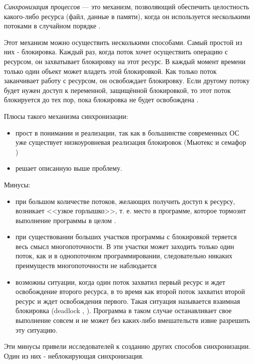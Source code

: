 \documentclass[12pt]{article}
\begin{document}
{			\par \textit{Синхронизация процессов} — это механизм, позволяющий обеспечить целостность какого-либо ресурса (файл, данные в памяти), когда он используется несколькими потоками в случайном порядке \cite{Sync}.
			\par Этот механизм можно осуществить несколькими способами. Самый простой из них - блокировка. Каждый раз, когда поток хочет осуществить операцию с ресурсом, он захватывает блокировку на этот ресурс. В каждый момент времени только один объект может владеть этой блокировкой. Как только поток заканчивает работу с ресурсом, он освобождает блокировку. Если другому потоку будет нужен доступ к переменной, защищённой блокировкой, то этот поток блокируется до тех пор, пока блокировка не будет освобождена \cite{lockmsdn}.
			\par Плюсы такого механизма синхронизации: 
			\begin{itemize}
				\item прост в понимании и реализации, так как в большинстве современных ОС уже существует низкоуровневая реализация блокировок (Мьютекс и семафор \cite{Tanenb})
				\item решает описанную выше проблему.
			\end{itemize}
				\vspace{1cm}
				\par Минусы:
			\begin{itemize}
				\item при большом количестве потоков, желающих получить доступ к ресурсу, возникает <<узкое горлышко>>, т. е. место в программе, которое тормозит выполнение программы в целом \cite{mutex}.
				\item при существовании больших участков программы с блокировкой теряется весь смысл многопоточности. В эти участки может заходить только один поток, как и в однопоточном программировании, следовательно никаких преимуществ многопоточности не наблюдается
				\item возможны ситуации, когда один поток захватил первый ресурс и ждет освобождение второго ресурса, в то время как второй поток захватил второй ресурс и ждет освобождения первого. Такая ситуация называется взаимная блокировка (deadlock \cite{deadlock}, \cite{deadlock2}). Программа в таком случае останавливает свое выполнение совсем и не может без каких-либо вмешательств извне разрешить эту ситуацию.
			\end{itemize}
			\par Эти минусы привели исследователей к созданию других способов синхронизации. Один из них - неблокирующая синхронизация. 
}
\end{document}
